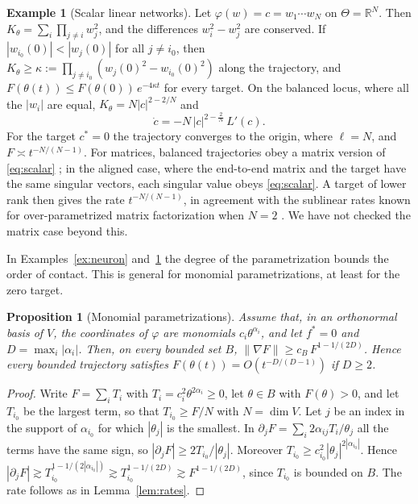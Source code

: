 \documentclass[11pt]{article}
\newtheorem{proposition}[lemma]{Proposition}
\theoremstyle{definition}
\newtheorem{example}[lemma]{Example}
\theoremstyle{remark}
\newcommand{\R}{\mathbb{R}}
\begin{document}
\begin{example}[Scalar linear networks]\label{ex:linear}
Let $\varphi(w)=c=w_1\cdots w_N$ on $\Theta=\R^N$. Then $K_\theta=\sum_i\prod_{j\ne i}w_j^2$, and the differences $w_i^2-w_j^2$ are conserved. If $|w_{i_0}(0)|<|w_j(0)|$ for all $j\ne i_0$, then $K_\theta\ge\kappa:=\prod_{j\ne i_0}(w_j(0)^2-w_{i_0}(0)^2)$ along the trajectory, and $F(\theta(t))\le F(\theta(0))\,e^{-4\kappa t}$ for every target. On the balanced locus, where all the $|w_i|$ are equal, $K_\theta=N|c|^{2-2/N}$ and
\begin{equation}\label{eq:scalar}
\dot c=-N\,|c|^{2-\frac2N}\,L'(c).
\end{equation}
For the target $c^*=0$ the trajectory converges to the origin, where $\ell=N$, and $F\asymp t^{-N/(N-1)}$. For matrices, balanced trajectories obey a matrix version of \eqref{eq:scalar} \cite{ACH18,BRTW22}; in the aligned case, where the end-to-end matrix and the target have the same singular vectors, each singular value obeys \eqref{eq:scalar}. A target of lower rank then gives the rate $t^{-N/(N-1)}$, in agreement with the sublinear rates known for over-parametrized matrix factorization when $N=2$ \cite{ZKHC24}. We have not checked the matrix case beyond this.
\end{example}

In Examples~\ref{ex:neuron} and~\ref{ex:linear} the degree of the parametrization bounds the order of contact. This is general for monomial parametrizations, at least for the zero target.

\begin{proposition}[Monomial parametrizations]\label{prop:monomial}
Assume that, in an orthonormal basis of $V$, the coordinates of $\varphi$ are monomials $c_i\theta^{\alpha_i}$, and let $f^*=0$ and $D=\max_i|\alpha_i|$. Then, on every bounded set $B$, $\|\nabla F\|\ge c_B\,F^{1-1/(2D)}$. Hence every bounded trajectory satisfies $F(\theta(t))=O(t^{-D/(D-1)})$ if $D\ge2$.
\end{proposition}

\begin{proof}
Write $F=\sum_iT_i$ with $T_i=c_i^2\theta^{2\alpha_i}\ge0$, let $\theta\in B$ with $F(\theta)>0$, and let $T_{i_0}$ be the largest term, so that $T_{i_0}\ge F/N$ with $N=\dim V$. Let $j$ be an index in the support of $\alpha_{i_0}$ for which $|\theta_j|$ is the smallest. In $\partial_jF=\sum_i2\alpha_{ij}T_i/\theta_j$ all the terms have the same sign, so $|\partial_jF|\ge2T_{i_0}/|\theta_j|$. Moreover $T_{i_0}\ge c_{i_0}^2|\theta_j|^{2|\alpha_{i_0}|}$. Hence $|\partial_jF|\gtrsim T_{i_0}^{1-1/(2|\alpha_{i_0}|)}\gtrsim T_{i_0}^{1-1/(2D)}\gtrsim F^{1-1/(2D)}$, since $T_{i_0}$ is bounded on $B$. The rate follows as in Lemma~\ref{lem:rates}.
\end{proof}
\end{document}
